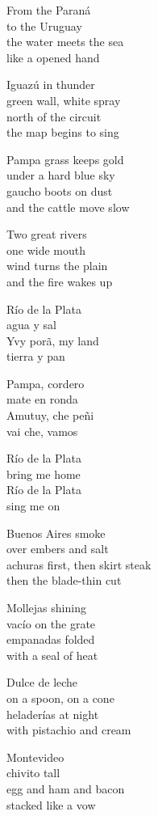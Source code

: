 \begin{lyrics}
From the Paraná\\
to the Uruguay\\
the water meets the sea\\
like a opened hand

Iguazú in thunder\\
green wall, white spray\\
north of the circuit\\
the map begins to sing

Pampa grass keeps gold\\
under a hard blue sky\\
gaucho boots on dust\\
and the cattle move slow

Two great rivers\\
one wide mouth\\
wind turns the plain\\
and the fire wakes up

Río de la Plata\\
agua y sal\\
Yvy porã, my land\\
tierra y pan

Pampa, cordero\\
mate en ronda\\
Amutuy, che peñi\\
vai che, vamos

Río de la Plata\\
bring me home\\
Río de la Plata\\
sing me on

Buenos Aires smoke\\
over embers and salt\\
achuras first, then skirt steak\\
then the blade-thin cut

Mollejas shining\\
vacío on the grate\\
empanadas folded\\
with a seal of heat

Dulce de leche\\
on a spoon, on a cone\\
heladerías at night\\
with pistachio and cream

Montevideo\\
chivito tall\\
egg and ham and bacon\\
stacked like a vow


\end{lyrics}

